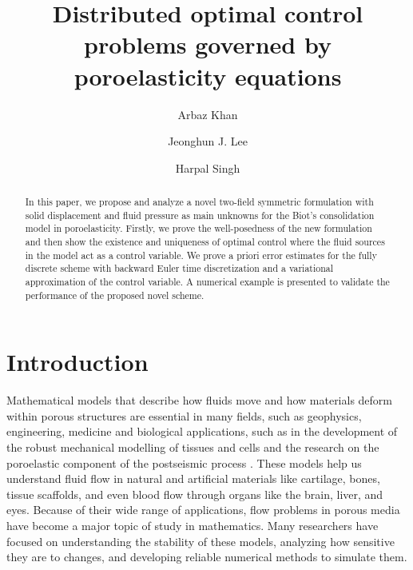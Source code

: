 \documentclass{amsart}
\title[Optimal control problems of poroelasticity equations]{Distributed optimal control problems governed by poroelasticity equations}
\author{Arbaz Khan}
\author{Jeonghun J. Lee}
\author{Harpal Singh}
\begin{document}

\begin{abstract}
	In this paper, we propose and analyze a novel two-field symmetric formulation with solid displacement and fluid pressure as main unknowns for the Biot’s consolidation model in poroelasticity. Firstly, we prove the well-posedness of the new formulation and then show the existence and uniqueness of optimal control where the fluid sources in the model act as a control variable. We prove a priori error estimates for the fully discrete scheme with backward Euler time discretization and a variational approximation of the control variable. A numerical example is presented to validate the performance of the proposed novel scheme.
\end{abstract}

\maketitle

\section{Introduction}
Mathematical models that describe how fluids move and how materials deform within porous structures are essential in many fields, such as geophysics, engineering, medicine and biological applications, such as in the development of the robust mechanical modelling of tissues and cells \cite{malandrino2019poroelasticity} and the research on the poroelastic component of the postseismic process \cite{mccormack2020modeling}. These models help us understand fluid flow in natural and artificial materials like cartilage, bones, tissue scaffolds, and even blood flow through organs like the brain, liver, and eyes. Because of their wide range of applications, flow problems in porous media have become a major topic of study in mathematics. Many researchers have focused on understanding the stability of these models, analyzing how sensitive they are to changes, and developing reliable numerical methods to simulate them. 
\end{document}
